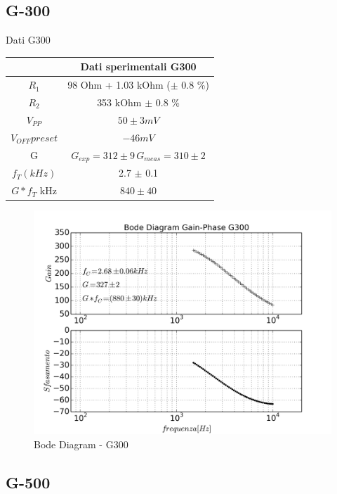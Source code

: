 \documentclass{beamer}
\begin{document}
\subsection{G-300}

\begin{frame}{Dati G300}

{
\centering
\begin{tabular}{|c|c|}
\hline  &  \textbf{Dati sperimentali G300} \\ 
\hline $R_1$  &  98 \si{Ohm} + 1.03 \si{kOhm} ($\pm$ 0.8 \%) \\ 
\hline $R_2$ & 353 \si{kOhm} $\pm$ 0.8 \%  \\ 
\hline $V_{PP}$ & $50  \pm 3 \si{mV} $ \\ 
\hline $V_{OFF} preset$ & $ -46  \si{mV} $ \\
\hline G &  $G_{exp}  = 312 \pm 9  \, G_{meas} = 310 \pm 2 $ \\ 
\hline $f_T (kHz)$ &  2.7 $\pm$ 0.1 \\
\hline $G*f_{T}$ \si{kHz} & $ 840 \pm 40 $\\
\hline
\end{tabular}
 
}

\end{frame}

\begin{frame}
\begin{figure}
\centering
\includegraphics[width=0.9\linewidth]{./es_9_bode_g300}
\caption{Bode Diagram - G300}
\label{fig:es_9_bode_g300}
\end{figure}
\end{frame}


\subsection{G-500}
\end{document}
